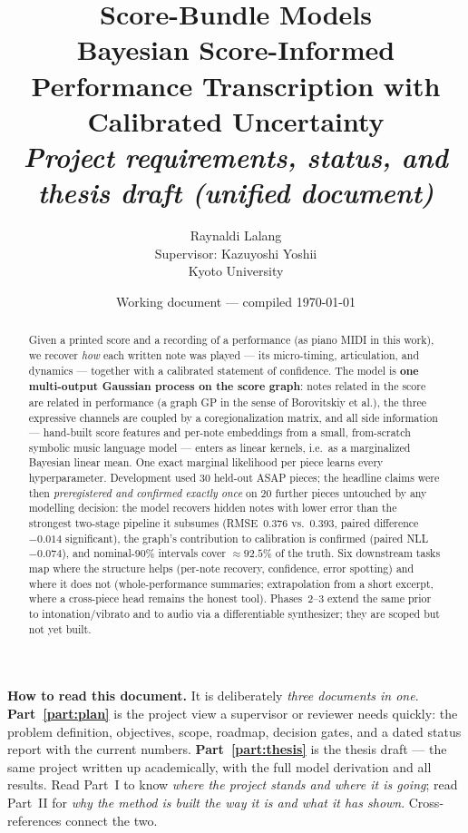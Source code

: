 \documentclass[11pt,a4paper]{report}
\title{\textbf{Score-Bundle Models}\\[0.3em]
  \large Bayesian Score-Informed Performance Transcription
  with Calibrated Uncertainty\\[0.4em]
  \normalsize\textit{Project requirements, status, and thesis draft (unified document)}}
\author{Raynaldi Lalang \\[0.5em]
  \small Supervisor: Kazuyoshi Yoshii \\
  \small Kyoto University}
\date{Working document --- compiled \today}
\newcommand{\nPieces}{30}
\newcommand{\nConfPieces}{20}
\newcommand{\rmseGP}{0.376}            %
\newcommand{\covGP}{92.5\%}
\newcommand{\rmseConfOldHead}{0.393}   %
\newcommand{\dRmseConf}{$-0.014$}      %
\newcommand{\dNllGraphConf}{$-0.074$}  %
\begin{document}
\maketitle

\begin{abstract}
\noindent Given a printed score and a recording of a performance (as piano MIDI in
this work), we recover \emph{how} each written note was played --- its
micro-timing, articulation, and dynamics --- together with a calibrated statement
of confidence. The model is \textbf{one multi-output Gaussian process on the score
graph}: notes related in the score are related in performance (a graph GP in the
sense of Borovitskiy et al.), the three expressive channels are coupled by a
coregionalization matrix, and all side information --- hand-built score features
and per-note embeddings from a small, from-scratch symbolic music language model
--- enters as linear kernels, i.e.\ as a marginalized Bayesian linear mean. One
exact marginal likelihood per piece learns every hyperparameter. Development used
\nPieces{} held-out ASAP pieces; the headline claims were then \emph{preregistered
and confirmed exactly once} on \nConfPieces{} further pieces untouched by any
modelling decision: the model recovers hidden notes with lower error than the
strongest two-stage pipeline it subsumes (RMSE~\rmseGP{} vs.\ \rmseConfOldHead,
paired difference \dRmseConf{} significant), the graph's contribution to
calibration is confirmed (paired NLL \dNllGraphConf), and nominal-90\% intervals
cover $\approx\covGP$ of the truth. Six downstream tasks map where the structure
helps (per-note recovery, confidence, error spotting) and where it does not
(whole-performance summaries; extrapolation from a short excerpt, where a
cross-piece head remains the honest tool). Phases~2--3 extend the same prior to
intonation/vibrato and to audio via a differentiable synthesizer; they are scoped
but not yet built.
\end{abstract}

\vspace{1em}
\noindent\textbf{How to read this document.} It is deliberately \emph{three
documents in one}. \textbf{Part~\ref{part:plan}} is the project view a supervisor
or reviewer needs quickly: the problem definition, objectives, scope, roadmap,
decision gates, and a dated status report with the current numbers.
\textbf{Part~\ref{part:thesis}} is the thesis draft --- the same project written
up academically, with the full model derivation and all results. Read Part~I to
know \emph{where the project stands and where it is going}; read Part~II for
\emph{why the method is built the way it is and what it has shown}. Cross-references
connect the two.
\end{document}
